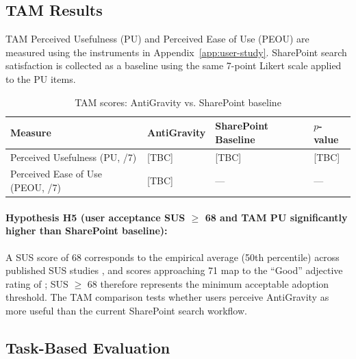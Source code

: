 
\subsection{TAM Results}

TAM \citep{Davis1989TAM} Perceived Usefulness (PU) and Perceived Ease of Use (PEOU) are measured using the instruments in Appendix~\ref{app:user-study}. SharePoint search satisfaction is collected as a baseline using the same 7-point Likert scale applied to the PU items.

\begin{table}[H]
\centering
\caption{TAM scores: AntiGravity vs. SharePoint baseline}
\label{tab:tam-results}
\begin{tabularx}{\textwidth}{@{}lXXX@{}}
\toprule
\textbf{Measure} & \textbf{AntiGravity} & \textbf{SharePoint Baseline} & \textbf{$p$-value} \\
\midrule
Perceived Usefulness (PU, /7) & [TBC] & [TBC] & [TBC] \\
Perceived Ease of Use (PEOU, /7) & [TBC] & --- & --- \\
\bottomrule
\end{tabularx}
\end{table}


\paragraph{Hypothesis H5 (user acceptance SUS $\geq$ 68 and TAM PU significantly higher than SharePoint baseline):} A SUS score of 68 corresponds to the empirical average (50th percentile) across published SUS studies \citep{Sauro2011SUS}, and scores approaching 71 map to the ``Good'' adjective rating of \citet{Bangor2009SUSAdjective}; SUS $\geq$ 68 therefore represents the minimum acceptable adoption threshold. The TAM comparison tests whether users perceive AntiGravity as more useful than the current SharePoint search workflow.

\subsection{Task-Based Evaluation}

